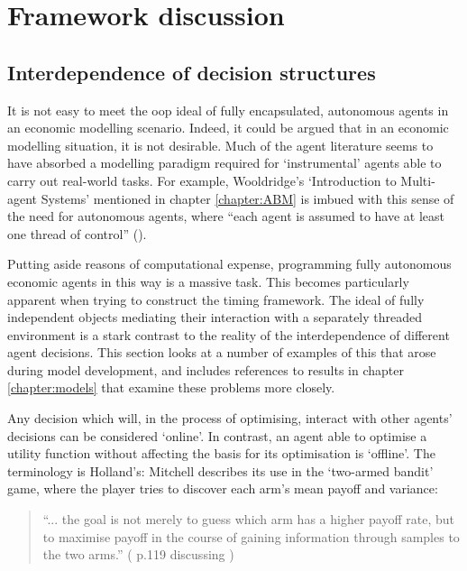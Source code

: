 \section{Framework discussion \label{sec:nutsnbolts}} 

\subsection{Interdependence of decision structures \label{sec:decstruct}}

It is not easy to meet the \gls{oop} ideal of fully encapsulated, autonomous agents in an economic modelling scenario. Indeed, it could be argued that in an economic modelling situation, it is not desirable. Much of the agent literature seems to have absorbed a modelling paradigm required for `instrumental' agents able to carry out real-world tasks. For example, Wooldridge's `Introduction to Multi-agent Systems' mentioned in chapter \ref{chapter:ABM} is imbued with this sense of the need for autonomous agents,  where ``each agent is assumed to have at least one thread of control'' (\citealt{wooldridge_introduction_2009}). 

Putting aside reasons of computational expense, programming fully autonomous economic agents in this way is a massive task. This becomes particularly apparent when trying to construct the timing framework. The ideal of fully independent objects mediating their interaction with a separately threaded environment is a stark contrast to the reality of the interdependence of different agent decisions. This section looks at a number of examples of this that arose during model development, and includes references to results in chapter \ref{chapter:models} that examine these problems more closely.

Any decision which will, in the process of optimising, interact with other agents' decisions can be considered `online'. In contrast, an agent able to optimise a utility function without affecting the basis for its optimisation is `offline'. The terminology is Holland's: Mitchell describes its use in the `two-armed bandit' game, where the player tries to discover each arm's mean payoff and variance:

\begin{quote}
``... the goal is not merely to guess which arm has a higher payoff rate, but to maximise payoff in the course of gaining information through samples to the two arms.'' (\citealt{mitchell_introduction_1998} p.119 discussing \citealt{holland_adaptation_1975})
\end{quote}

